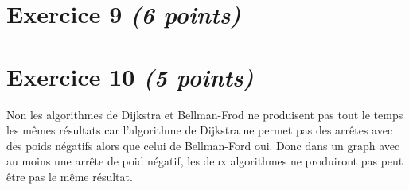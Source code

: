 \documentclass{article}
\begin{document}
\clearpage

\section{Exercice 9 \emph{(6 points)}}

\clearpage

\section{Exercice 10 \emph{(5 points)}}

Non les algorithmes de Dijkstra et Bellman-Frod ne produisent pas tout le temps les mêmes résultats car l'algorithme de Dijkstra ne permet pas des arrêtes avec des poids négatifs alors que celui de Bellman-Ford oui. Donc dans un graph avec au moins une arrête de poid négatif, les deux algorithmes ne produiront pas peut être pas le même résultat.
\end{document}

